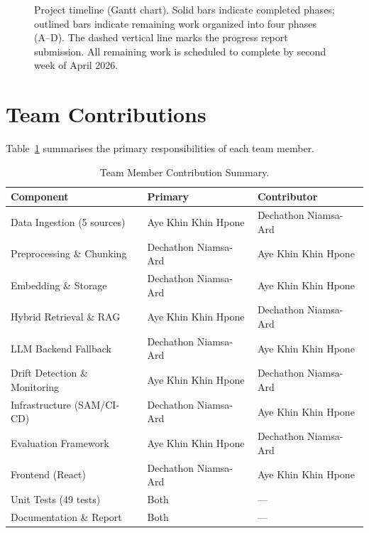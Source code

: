 \documentclass[12pt,a4paper]{report}
\begin{document}
\begin{figure}[H]
{%
}
\caption{Project timeline (Gantt chart). Solid bars indicate completed phases; outlined bars indicate remaining work organized into four phases (A--D). The dashed vertical line marks the progress report submission. All remaining work is scheduled to complete by second week of April 2026.}
\label{fig:gantt}
\end{figure}

\section{Team Contributions}
\label{sec:contributions}

Table~\ref{tab:contributions} summarises the primary responsibilities of each team member.

\begin{table}[H]
\caption{Team Member Contribution Summary.}
\label{tab:contributions}
\centering
\begin{tabular}{p{4.0cm}p{4.0cm}p{4.5cm}}
\toprule
\textbf{Component} & \textbf{Primary} & \textbf{Contributor} \\
\midrule
Data Ingestion (5 sources) & Aye Khin Khin Hpone & Dechathon Niamsa-Ard \\
Preprocessing \& Chunking & Dechathon Niamsa-Ard & Aye Khin Khin Hpone \\
Embedding \& Storage & Dechathon Niamsa-Ard & Aye Khin Khin Hpone \\
Hybrid Retrieval \& RAG & Aye Khin Khin Hpone & Dechathon Niamsa-Ard \\
LLM Backend Fallback & Dechathon Niamsa-Ard & Aye Khin Khin Hpone \\
Drift Detection \& Monitoring & Aye Khin Khin Hpone & Dechathon Niamsa-Ard \\
Infrastructure (SAM/CI-CD) & Dechathon Niamsa-Ard & Aye Khin Khin Hpone \\
Evaluation Framework & Aye Khin Khin Hpone & Dechathon Niamsa-Ard \\
Frontend (React) & Dechathon Niamsa-Ard & Aye Khin Khin Hpone \\
Unit Tests (49 tests) & Both & --- \\
Documentation \& Report & Both & --- \\
\bottomrule
\end{tabular}
\end{table}
\end{document}
